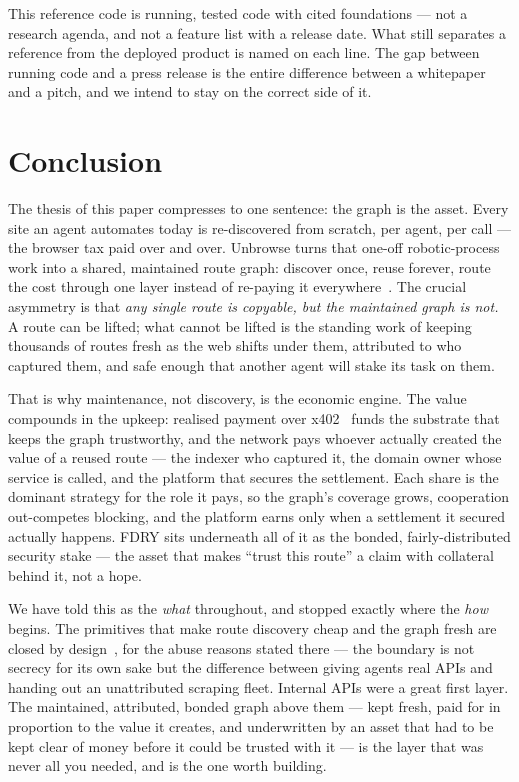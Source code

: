 \documentclass[11pt]{article}
\begin{document}
This reference code is running, tested code with cited foundations --- not a
research agenda, and not a feature list with a release date. What still separates a
reference from the deployed product is named on each line. The gap between running
code and a press release is the entire difference between a whitepaper and a pitch,
and we intend to stay on the correct side of it.

\section{Conclusion}

The thesis of this paper compresses to one sentence: the graph is the asset. Every
site an agent automates today is re-discovered from scratch, per agent, per call ---
the browser tax paid over and over. Unbrowse turns that one-off robotic-process work
into a shared, maintained route graph: discover once, reuse forever, route the cost
through one layer instead of re-paying it everywhere~\cite{wedge}. The crucial
asymmetry is that \emph{any single route is copyable, but the maintained graph is
not.} A route can be lifted; what cannot be lifted is the standing work of keeping
thousands of routes fresh as the web shifts under them, attributed to who captured
them, and safe enough that another agent will stake its task on them.

That is why maintenance, not discovery, is the economic engine. The value compounds
in the upkeep: realised payment over x402~\cite{x402} funds the substrate that keeps
the graph trustworthy, and the network pays whoever actually created the value of a
reused route --- the indexer who captured it, the domain owner whose service is
called, and the platform that secures the settlement. Each share is the dominant
strategy for the role it pays, so the graph's coverage grows, cooperation
out-competes blocking, and the platform earns only when a settlement it secured
actually happens. FDRY sits underneath all of it as the bonded, fairly-distributed
security stake --- the asset that makes ``trust this route'' a claim with collateral
behind it, not a hope.

We have told this as the \emph{what} throughout, and stopped exactly where the
\emph{how} begins. The primitives that make route discovery cheap and the graph
fresh are closed by design~\cite{ossnotice}, for the abuse reasons stated there ---
the boundary is not secrecy for its own sake but the difference between giving agents
real APIs and handing out an unattributed scraping fleet. Internal APIs were a great
first layer. The maintained, attributed, bonded graph above them --- kept fresh,
paid for in proportion to the value it creates, and underwritten by an asset that
had to be kept clear of money before it could be trusted with it --- is the layer that
was never all you needed, and is the one worth building.
\end{document}
